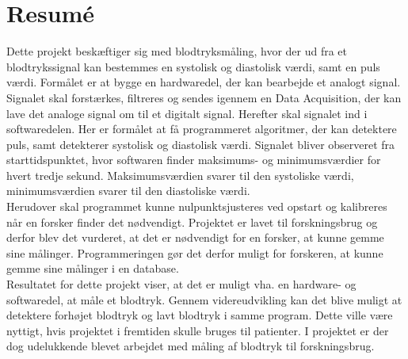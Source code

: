 \chapter{Resumé}
Dette projekt beskæftiger sig med blodtryksmåling, hvor der ud fra et blodtrykssignal kan bestemmes en systolisk og diastolisk værdi, samt en puls værdi. Formålet er at bygge en hardwaredel, der kan bearbejde et analogt signal. Signalet skal forstærkes, filtreres og sendes igennem en Data Acquisition, der kan lave det analoge signal om til et digitalt signal. Herefter skal signalet ind i softwaredelen. Her er formålet at få programmeret algoritmer, der kan detektere puls, samt detekterer systolisk og diastolisk værdi.  Signalet bliver observeret fra starttidspunktet, hvor softwaren finder maksimums- og minimumsværdier for hvert tredje sekund. Maksimumsværdien svarer til den systoliske værdi, minimumsværdien svarer til den diastoliske værdi.\\
Herudover skal programmet kunne nulpunktsjusteres ved opstart og kalibreres når en forsker finder det nødvendigt. Projektet er lavet til forskningsbrug og derfor blev det vurderet, at det er nødvendigt for en forsker, at kunne gemme sine målinger. Programmeringen gør det derfor muligt for forskeren, at kunne gemme sine målinger i en database.  \\
Resultatet for dette projekt viser, at det er muligt vha. en hardware- og softwaredel, at måle et blodtryk. Gennem videreudvikling kan det blive muligt at detektere forhøjet blodtryk og lavt blodtryk i samme program. Dette ville være nyttigt, hvis projektet i fremtiden skulle bruges til patienter. I projektet er der dog udelukkende blevet arbejdet med måling af blodtryk til forskningsbrug.
